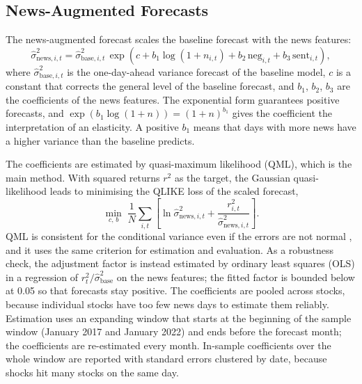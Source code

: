 \documentclass[12pt,a4paper]{article}
\begin{document}
\subsection{News-Augmented Forecasts}\label{sec:method-news}
The news-augmented forecast scales the baseline forecast with the news features:
\begin{equation}
  \hat\sigma^2_{\text{news},i,t} = \hat\sigma^2_{\text{base},i,t}\,\exp\!\left(c + b_1 \log(1 + n_{i,t}) + b_2\, \text{neg}_{i,t} + b_3\, \text{sent}_{i,t}\right),
  \label{eq:news-model}
\end{equation}
where $\hat\sigma^2_{\text{base},i,t}$ is the one-day-ahead variance forecast of the baseline model, $c$ is a constant that corrects the general level of the baseline forecast, and $b_1$, $b_2$, $b_3$ are the coefficients of the news features. The exponential form guarantees positive forecasts, and $\exp(b_1\log(1+n)) = (1+n)^{b_1}$ gives the coefficient the interpretation of an elasticity. A positive $b_1$ means that days with more news have a higher variance than the baseline predicts.

The coefficients are estimated by quasi-maximum likelihood (QML), which is the main method. With squared returns $r^2$ as the target, the Gaussian quasi-likelihood leads to minimising the QLIKE loss of the scaled forecast,
\begin{equation}
  \min_{c,\,b}\; \frac{1}{N}\sum_{i,t}\left[\ln \hat\sigma^2_{\text{news},i,t} + \frac{r_{i,t}^2}{\hat\sigma^2_{\text{news},i,t}}\right].
  \label{eq:qml}
\end{equation}
QML is consistent for the conditional variance even if the errors are not normal \parencite{bollerslev1992}, and it uses the same criterion for estimation and evaluation. As a robustness check, the adjustment factor is instead estimated by ordinary least squares (OLS) in a regression of $r_t^2/\hat\sigma^2_{\text{base}}$ on the news features; the fitted factor is bounded below at 0.05 so that forecasts stay positive. The coefficients are pooled across stocks, because individual stocks have too few news days to estimate them reliably. Estimation uses an expanding window that starts at the beginning of the sample window (January 2017 and January 2022) and ends before the forecast month; the coefficients are re-estimated every month. In-sample coefficients over the whole window are reported with standard errors clustered by date, because shocks hit many stocks on the same day.
\end{document}

